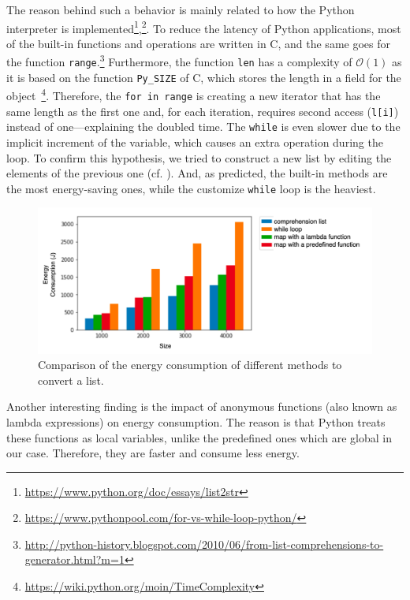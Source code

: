 The reason behind such a behavior is mainly related to how the Python interpreter is implemented\footnote{\url{https://www.python.org/doc/essays/list2str}},\footnote{\url{https://www.pythonpool.com/for-vs-while-loop-python/}}.
To reduce the latency of Python applications, most of the built-in functions and operations are written in C, and the same goes for the function \texttt{range}.\footnote{\url{ http://python-history.blogspot.com/2010/06/from-list-comprehensions-to-generator.html?m=1}}
Furthermore, the function \texttt{len} has a complexity of $\mathcal{O}(1)$ as it is based on the function \texttt{Py\_SIZE} of C, which stores the length in a field for the object~\footnote{\url{https://wiki.python.org/moin/TimeComplexity}}.
Therefore, the \texttt{for in range} is creating a new iterator that has the same length as the first one and, for each iteration, requires second access (\texttt{l[i]}) instead of one---explaining the doubled time.
The \texttt{while} is even slower due to the implicit increment of the variable, which causes an extra operation during the loop.
To confirm this hypothesis, we tried to construct a new list by editing the elements of the previous one (cf. ).
And, as predicted, the built-in methods are the most energy-saving ones, while the customize \texttt{while} loop is the heaviest.

\begin{figure}
    \centering
    \includegraphics[width=\linewidth]{imgs/python_treatemens}
    \caption{Comparison of the energy consumption of different methods to convert a list.}
    \label{fig:pythontreatement}
\end{figure}

Another interesting finding is the impact of anonymous functions (also known as lambda expressions) on energy consumption.
The reason is that Python treats these functions as local variables, unlike the predefined ones which are global in our case.
Therefore, they are faster and consume less energy.  %


